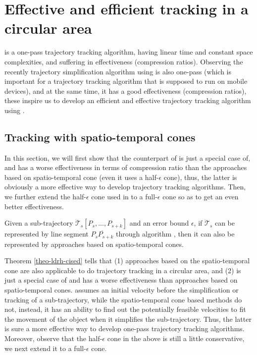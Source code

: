 \section{Effective and efficient tracking in a circular area}
\label{sec:circle}

{\ldrh is a one-pass trajectory tracking algorithm, having linear time and constant space complexities, and suffering in effectiveness (compression ratios).
Observing the recently trajectory simplification algorithm \cised using \sed is also one-pass (which is important for a trajectory tracking algorithm that is supposed to run on mobile devices), and at the same time, it has a good effectiveness (compression ratios), these inspire us to develop an efficient and effective trajectory tracking algorithm using \sed.}


\subsection{Tracking with spatio-temporal cones}

In this section, we will first show that the counterpart of \ldrh is just a special case of, and has a worse effectiveness in terms of compression ratio than the approaches based on spatio-temporal cone (even it uses a half-$\epsilon$ cone), thus, the latter is obviously a more effective way to develop trajectory tracking algorithms. Then, we further extend the half-$\epsilon$ cone used in \cised to a full-$\epsilon$ cone so as to get an even better effectiveness.



\begin{theorem}
\label{theo-ldrh-cised}
Given a sub-trajectory $\dddot{\mathcal{T}}_s[P_s,...,P_{s+k}]$ and an error bound $\epsilon$, if $\dddot{\mathcal{T}}_s$ can be represented by line segment $\overline{P_sP_{s+k}}$ through algorithm \ldrh, then it can also be represented by approaches based on spatio-temporal cones.
\end{theorem}

Theorem \ref{theo-ldrh-cised} tells that (1) {approaches based on the spatio-temporal cone are also applicable to do trajectory tracking in a circular area}, and (2) \ldrh is just a special case of and has a worse effectiveness than approaches based on spatio-temporal cones. \ldrh assumes an initial velocity before the simplification or tracking of a sub-trajectory, while the spatio-temporal cone based methods do not, instead, it has an ability to find out the potentially feasible velocities to fit the movement of the object when it simplifies the sub-trajectory. Thus, the latter is sure a more effective way to develop one-pass trajectory tracking algorithms. 
%
Moreover, observe that the half-$\epsilon$ cone in the above is still a little conservative, we next extend it to a full-$\epsilon$ cone.%


